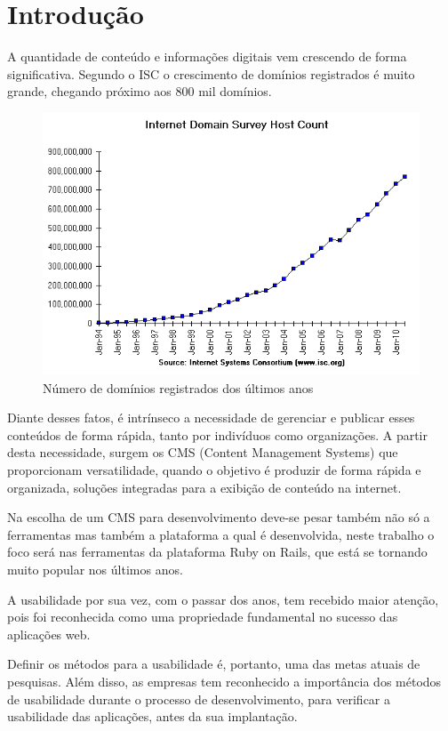 \chapter{Introdução}

A quantidade de conteúdo e informações digitais vem crescendo de forma significativa. Segundo o ISC o crescimento de domínios registrados é muito grande, chegando próximo aos 800 mil domínios. 

\begin{figure}[here]
\includegraphics[width=150mm]{images/isc_hosts.png}
\caption{Número de domínios registrados dos últimos anos}
\label{fig:isc_hosts.png}
\end{figure}

Diante desses fatos, é intrínseco a necessidade de gerenciar e publicar esses conteúdos de forma rápida, tanto por indivíduos como organizações. A partir desta necessidade, surgem os CMS (Content Management Systems) que proporcionam versatilidade, quando o objetivo é produzir de forma rápida e organizada, soluções integradas para a exibição de conteúdo na internet. 

Na escolha de um CMS para desenvolvimento deve-se pesar também não só a ferramentas mas também a plataforma a qual é desenvolvida, neste trabalho o foco será nas ferramentas da plataforma Ruby on Rails, que está se tornando muito popular nos últimos anos.

A usabilidade por sua vez, com o passar dos anos, tem recebido maior atenção, pois foi reconhecida como uma propriedade fundamental no sucesso das aplicações web.

Definir os métodos para a usabilidade é, portanto, uma das metas atuais de pesquisas. Além disso, as empresas tem reconhecido a importância dos métodos de usabilidade durante o processo de desenvolvimento, para verificar a usabilidade das aplicações, antes da sua implantação.

